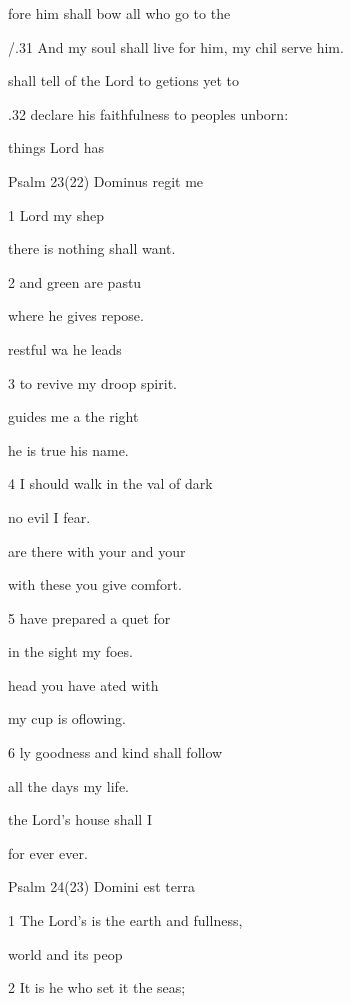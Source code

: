fore him shall bow all who go  to the  

/.31 And my soul shall live for him, my chil serve him. 

 shall tell of the Lord to getions yet to  

.32 declare his faithfulness to peoples  unborn: 

 things  Lord has  

Psalm 23(22) Dominus regit me 


1  Lord  my shep 

there is nothing  shall want. 

2  and green are  pastu 

where he gives  repose. 

 restful wa he leads  

3 to revive my droop spirit. 

 guides me a the right  

he is true  his name. 

4  I should walk in the val of dark 

no evil  I fear. 

 are there with your  and your  

with these you give  comfort. 

5  have prepared a quet for  

in the sight  my foes. 

 head you have ated with  

my cup is oflowing. 

6 ly goodness and kind shall follow  

all the days  my life. 

 the Lord's  house shall I  

for ever  ever. 

Psalm 24(23) Domini est terra 


1 The Lord's is the earth and  fullness, 

 world and  its peop 

2 It is he who set it  the seas; 

